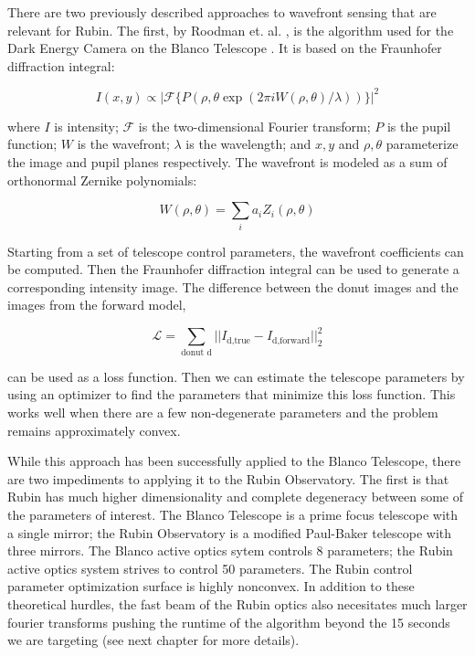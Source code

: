 There are two previously described approaches to wavefront sensing that are relevant for Rubin. The first, by Roodman et. al. \cite{2014roodman}, is the algorithm used for the Dark Energy Camera on the Blanco Telescope \cite{darkenergycamera}. It is based on the Fraunhofer diffraction integral:

\begin{equation}\label{eqn:fraunhofer}
I(x,y) \propto |\mathcal{F}\{P(\rho, \theta \exp(2\pi i W(\rho, \theta) / \lambda))\}|^2
\end{equation}

\noindent where $I$ is intensity; $\mathcal{F}$ is the two-dimensional Fourier transform; $P$ is the pupil function; $W$ is the wavefront; $\lambda$ is the wavelength; and $x,y$ and $\rho, \theta$ parameterize the image and pupil planes respectively. The wavefront is modeled as a sum of orthonormal Zernike polynomials:

\begin{equation}\label{eqn:zernike_decomp}
W(\rho, \theta) = \sum_i a_i Z_i(\rho, \theta)
\end{equation}

\noindent Starting from a set of telescope control parameters, the wavefront coefficients can be computed. Then the Fraunhofer diffraction integral can be used to generate a corresponding intensity image. The difference between the donut images and the images from the forward model,

\begin{equation}\label{eqn:loss}
\mathcal{L} = \sum_{\text{donut d}}||I_{\text{d,true}} - I_{\text{d,forward}}||_2^2
\end{equation}

\noindent can be used as a loss function. Then we can estimate the telescope parameters by using an optimizer to find the parameters that minimize this loss function. This works well when there are a few non-degenerate parameters and the problem remains approximately convex.

While this approach has been successfully applied to the Blanco Telescope, there are two impediments to applying it to the Rubin Observatory. The first is that Rubin has much higher dimensionality and complete degeneracy between some of the parameters of interest. The Blanco Telescope is a prime focus telescope with a single mirror; the Rubin Observatory is a modified Paul-Baker telescope with three mirrors. The Blanco active optics sytem controls 8 parameters; the Rubin active optics system strives to control 50 parameters. The Rubin control parameter optimization surface is highly nonconvex. In addition to these theoretical hurdles, the fast beam of the Rubin optics also necesitates much larger fourier transforms pushing the runtime of the algorithm beyond the 15 seconds we are targeting (see next chapter for more details). 

